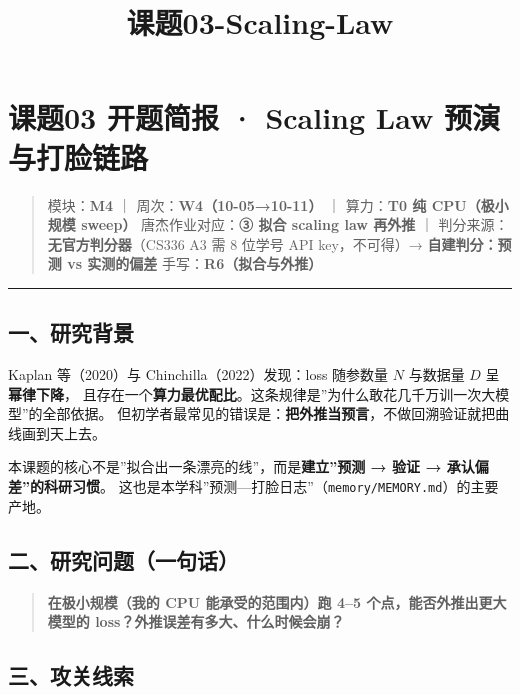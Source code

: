 \documentclass[
  chinese,
  11pt,
]{ctexart}
\title{课题03-Scaling-Law}
\author{}
\date{}
\begin{document}
\maketitle

{
\setcounter{tocdepth}{2}
\tableofcontents
}
\section{课题03 开题简报 · Scaling Law 预演与打脸链路}\label{ux8bfeux989803-ux5f00ux9898ux7b80ux62a5-scaling-law-ux9884ux6f14ux4e0eux6253ux8138ux94feux8def}

\begin{quote}
模块：\textbf{M4} ｜ 周次：\textbf{W4（10-05→10-11）} ｜ 算力：\textbf{T0 纯 CPU（极小规模 sweep）} 唐杰作业对应：\textbf{③ 拟合 scaling law 再外推} ｜ 判分来源：\textbf{无官方判分器}（CS336 A3 需 8 位学号 API key，不可得）→ \textbf{自建判分：预测 vs 实测的偏差} 手写：\textbf{R6（拟合与外推）}
\end{quote}

\begin{center}\rule{0.5\linewidth}{0.5pt}\end{center}

\subsection{一、研究背景}\label{ux4e00ux7814ux7a76ux80ccux666f}

Kaplan 等（2020）与 Chinchilla（2022）发现：loss 随参数量 \(N\) 与数据量 \(D\) 呈\textbf{幂律下降}， 且存在一个\textbf{算力最优配比}。这条规律是''为什么敢花几千万训一次大模型''的全部依据。 但初学者最常见的错误是：\textbf{把外推当预言}，不做回溯验证就把曲线画到天上去。

本课题的核心不是''拟合出一条漂亮的线''，而是\textbf{建立''预测 → 验证 → 承认偏差''的科研习惯}。 这也是本学科''预测---打脸日志''（\texttt{memory/MEMORY.md}）的主要产地。

\subsection{二、研究问题（一句话）}\label{ux4e8cux7814ux7a76ux95eeux9898ux4e00ux53e5ux8bdd}

\begin{quote}
\textbf{在极小规模（我的 CPU 能承受的范围内）跑 4--5 个点，能否外推出更大模型的 loss？外推误差有多大、什么时候会崩？}
\end{quote}

\subsection{三、攻关线索}\label{ux4e09ux653bux5173ux7ebfux7d22}
\end{document}
